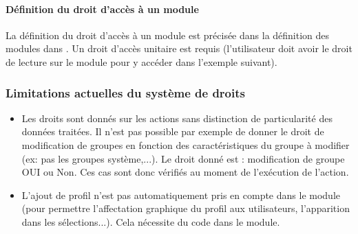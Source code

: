 \paragraph{Définition du droit d'accès à un module}

La définition du droit d'accès à un module est précisée dans la définition des modules dans .
Un droit d'accès unitaire est requis (l'utilisateur doit avoir le droit de lecture  sur le module \settings pour y accéder dans l'exemple suivant).\\



\subsubsection{Limitations actuelles du système de droits}

\begin{itemize}
\item Les droits sont donnés sur les actions sans distinction de particularité des données traitées. Il n'est pas possible par exemple de donner le droit de modification de groupes en fonction des caractéristiques du groupe à modifier (ex: pas les groupes système,...). Le droit donné est : modification de groupe OUI ou Non. Ces cas sont donc vérifiés au moment de l'exécution de l'action.

\item L'ajout de profil n'est pas automatiquement pris en compte dans le module \user (pour permettre l'affectation graphique du profil aux utilisateurs, l'apparition dans les sélections...). Cela nécessite du code dans le module.
\end{itemize}